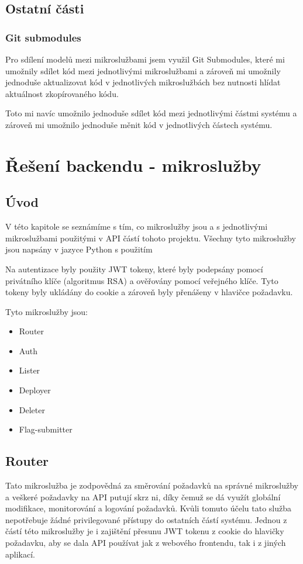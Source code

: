 \documentclass[12pt, a4paper,
oneside,      %
openright
]{report}
\begin{document}
\section{Ostatní části}
\subsection{Git submodules}
Pro sdílení modelů mezi mikroslužbami jsem využil Git Submodules, které mi umožnily sdílet kód mezi jednotlivými mikroslužbami a zároveň mi umožnily jednoduše aktualizovat kód v jednotlivých mikroslužbách bez nutnosti hlídat aktuálnost zkopírovaného kódu.

Toto mi navíc umožnilo jednoduše sdílet kód mezi jednotlivými částmi systému a zároveň mi umožnilo jednoduše měnit kód v jednotlivých částech systému.


\chapter{Řešení backendu - mikroslužby}

\section{Úvod}
\label{sec:uvod}

V této kapitole se seznámíme s tím, co mikroslužby jsou a s jednotlivými mikroslužbami použitými v API částí tohoto projektu. Všechny tyto mikroslužby jsou napsány v jazyce Python s použitím 

Na autentizace byly použity JWT tokeny, které byly podepsány pomocí privátního klíče (algoritmus RSA) a ověřovány pomocí veřejného klíče. Tyto tokeny byly ukládány do cookie a zároveň byly přenášeny v hlavičce požadavku.

Tyto mikroslužby jsou:
\begin{itemize}
	\item Router
	\item Auth
	\item Lister
	\item Deployer 
	\item Deleter
	\item Flag-submitter
\end{itemize}

\section{Router}
Tato mikroslužba je zodpovědná za směrování požadavků na správné mikroslužby a veškeré požadavky na API putují skrz ni, díky čemuž se dá využít globální modifikace, monitorování a logování požadavků. Kvůli tomuto účelu tato služba nepotřebuje žádné privilegované přístupy do ostatních částí systému. Jednou z částí této mikroslužby je i zajištění přesunu JWT tokenu z cookie do hlavičky požadavku, aby se dala API používat jak z webového frontendu, tak i z jiných aplikací.
\end{document}
